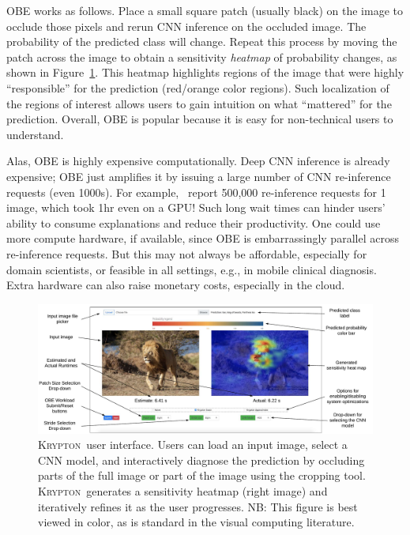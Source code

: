 \documentclass{vldb}
\newcommand{\system}{\textsc{Krypton}}
\begin{document}
OBE works as follows. Place a small square patch (usually black) on the image to occlude those pixels and rerun CNN inference on the occluded image. The probability of the predicted class will change. Repeat this process by moving the patch across the image to obtain a sensitivity \textit{heatmap} of probability changes, as shown in Figure~\ref{img:ui}. This heatmap highlights regions of the image that were highly ``responsible'' for the prediction (red/orange color regions). Such localization of the regions of interest allows users to gain intuition on what ``mattered'' for the prediction.
Overall, OBE is popular because it is easy for non-technical users to understand.

Alas, OBE is highly expensive computationally. Deep CNN inference is already expensive; OBE just amplifies it by issuing a large number of CNN re-inference requests (even 1000s). For example,~\cite{zintgraf2017visualizing} report 500,000 re-inference requests for 1 image, which took 1hr even on a GPU! Such long wait times can hinder users' ability to consume explanations and reduce their productivity. One could use more compute hardware, if available, since OBE is embarrassingly parallel across re-inference requests. But this may not always be affordable, especially for domain scientists, or feasible in all settings, e.g., in mobile clinical diagnosis. Extra hardware can also raise monetary costs, especially in the cloud.


\begin{figure}[t]\label{img:ui}
\includegraphics[width=\textwidth]{images/ui_actual_compressed.pdf}
\caption{\system~user interface. Users can load an input image, select a CNN model, and interactively diagnose the prediction by occluding parts of the full image or part of the image using the cropping tool. \system~generates a sensitivity heatmap (right image) and iteratively refines it as the user progresses. NB: This figure is best viewed in color, as is standard in the visual computing literature.}
\vspace{-2mm}
\end{figure}
\end{document}
